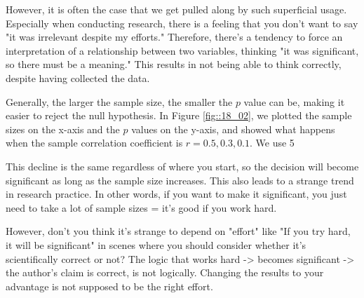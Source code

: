 \documentclass{ltjsbook}
\begin{document}
However, it is often the case that we get pulled along by such superficial usage. Especially when conducting research, there is a feeling that you don't want to say "it was irrelevant despite my efforts." Therefore, there's a tendency to force an interpretation of a relationship between two variables, thinking "it was significant, so there must be a meaning." This results in not being able to think correctly, despite having collected the data.

Generally, the larger the sample size, the smaller the $p$ value can be, making it easier to reject the null hypothesis. In Figure \ref{fig::18_02}, we plotted the sample sizes on the x-axis and the $p$ values on the y-axis, and showed what happens when the sample correlation coefficient is $r=0.5,0.3,0.1$. We use 5%



This decline is the same regardless of where you start, so the decision will become significant as long as the sample size increases. This also leads to a strange trend in research practice. In other words, if you want to make it significant, you just need to take a lot of sample sizes = it's good if you work hard.

However, don't you think it's strange to depend on "effort" like "If you try hard, it will be significant" in scenes where you should consider whether it's scientifically correct or not? The logic that works hard -> becomes significant -> the author's claim is correct, is not logically. Changing the results to your advantage is not supposed to be the right effort.
\end{document}

